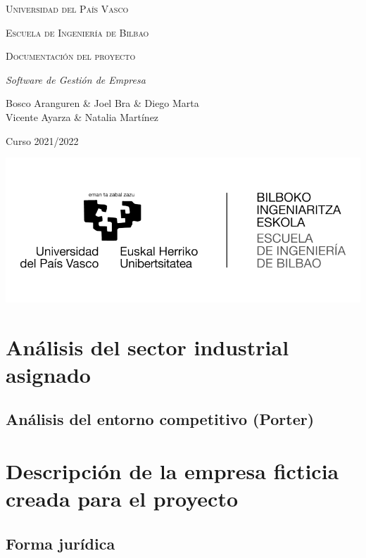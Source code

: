 \documentclass[12pt, letterpaper]{article}
\begin{document}
\begin{titlepage}
    \centering
    {\scshape\Large Universidad del País Vasco \par}
    {\scshape\Large Escuela de Ingeniería de Bilbao \par}
    \vspace{2cm}
    {\scshape\Huge {Documentación del proyecto} \par}
    {\itshape\Large Software de Gestión de Empresa\par}
    \vspace{5cm} 
    {\Large Bosco Aranguren \& Joel Bra \& Diego Marta\\Vicente Ayarza \& Natalia Martínez\par}
    \vspace{0.2cm}
    {\large Curso 2021/2022 \par}
    \vspace{0.1cm}
    \includegraphics[scale=0.25]{Imagenes/logo.png}
\end{titlepage}
    
    
\thispagestyle{empty}
\clearpage
\tableofcontents
\clearpage
\section{Análisis del sector industrial
asignado}

\subsection{Análisis del entorno competitivo (Porter)}

\section{Descripción de la empresa ficticia creada para el proyecto}
\subsection{Forma jurídica}

\end{document}
